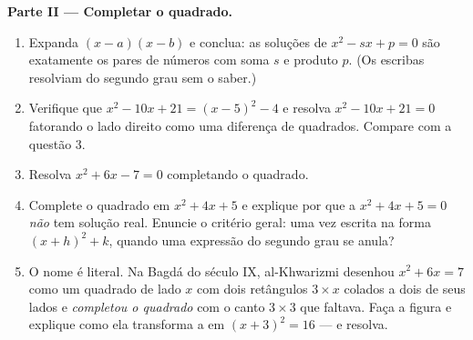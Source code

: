 \begin{problem}[{Problema de fim de semana --- problemas de soma e
produto, completar o quadrado como al-Khwarizmi o desenhou, e a
equação $x^2 = x + 1$}]
\medskip
\noindent\textbf{Parte II --- Completar o quadrado.}
\begin{enumerate}[resume]
  \item Expanda $(x - a)(x - b)$ e conclua: as soluções de
        $x^2 - sx + p = 0$ são exatamente os pares de números com
        soma $s$ e produto $p$. (Os escribas resolviam 
        do segundo grau sem o saber.)
  \item Verifique que $x^2 - 10x + 21 = (x - 5)^2 - 4$ e resolva
        $x^2 - 10x + 21 = 0$ fatorando o lado direito como uma
        diferença de quadrados. Compare com a questão 3.
  \item Resolva $x^2 + 6x - 7 = 0$ completando o quadrado.
  \item Complete o quadrado em $x^2 + 4x + 5$ e explique por que
        a  $x^2 + 4x + 5 = 0$ \emph{não} tem solução real.
        Enuncie o critério geral: uma vez escrita na forma
        $(x + h)^2 + k$, quando uma expressão do segundo grau se
        anula?
  \item O nome é literal. Na Bagdá do século IX, al-Khwarizmi
        desenhou $x^2 + 6x = 7$ como um quadrado de lado $x$ com
        dois retângulos $3 \times x$ colados a dois de seus lados
        e \emph{completou o quadrado} com o canto $3 \times 3$
        que faltava. Faça a figura e explique como ela transforma
        a  em $(x + 3)^2 = 16$ --- e resolva.
\end{enumerate}


\end{problem}
